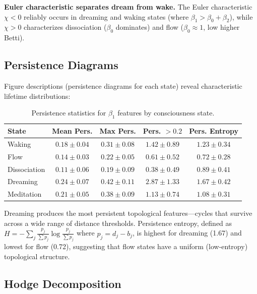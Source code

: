 \documentclass[11pt,a4paper]{article}
\begin{document}
\textbf{Euler characteristic separates dream from wake.}
The Euler characteristic $\chi < 0$ reliably occurs in dreaming and waking states (where $\beta_1 > \beta_0 + \beta_2$), while $\chi > 0$ characterizes dissociation ($\beta_0$ dominates) and flow ($\beta_0 \approx 1$, low higher Betti).

\subsection{Persistence Diagrams}

Figure descriptions (persistence diagrams for each state) reveal characteristic lifetime distributions:

\begin{table}[h]
\centering
\caption{Persistence statistics for $\beta_1$ features by consciousness state.}
\label{tab:persistence}
\begin{tabular}{lcccc}
\toprule
\textbf{State} & \textbf{Mean Pers.} & \textbf{Max Pers.} & \textbf{Pers. $> 0.2$} & \textbf{Pers. Entropy} \\
\midrule
Waking       & $0.18 \pm 0.04$ & $0.31 \pm 0.08$ & $1.42 \pm 0.89$ & $1.23 \pm 0.34$ \\
Flow         & $0.14 \pm 0.03$ & $0.22 \pm 0.05$ & $0.61 \pm 0.52$ & $0.72 \pm 0.28$ \\
Dissociation & $0.11 \pm 0.06$ & $0.19 \pm 0.09$ & $0.38 \pm 0.49$ & $0.89 \pm 0.41$ \\
Dreaming     & $0.24 \pm 0.07$ & $0.42 \pm 0.11$ & $2.87 \pm 1.33$ & $1.67 \pm 0.42$ \\
Meditation   & $0.21 \pm 0.05$ & $0.38 \pm 0.09$ & $1.13 \pm 0.74$ & $1.08 \pm 0.31$ \\
\bottomrule
\end{tabular}
\end{table}

Dreaming produces the most persistent topological features---cycles that survive across a wide range of distance thresholds.
Persistence entropy, defined as $H = -\sum_j \frac{p_j}{\sum p_j} \log \frac{p_j}{\sum p_j}$ where $p_j = d_j - b_j$, is highest for dreaming (1.67) and lowest for flow (0.72), suggesting that flow states have a uniform (low-entropy) topological structure.

\subsection{Hodge Decomposition}
\end{document}
